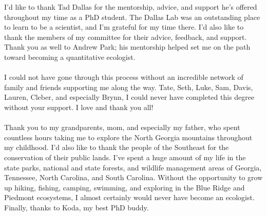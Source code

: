 
I’d like to thank Tad Dallas for the mentorship, advice, and support he’s offered throughout my time as a PhD student. The Dallas Lab was an outstanding place to learn to be a scientist, and I’m grateful for my time there. I’d also like to thank the members of my committee for their advice, feedback, and support. Thank you as well to Andrew Park; his mentorship helped set me on the path toward becoming a quantitative ecologist.
\paragraph{}
I could not have gone through this process without an incredible network of family and friends supporting me along the way. Tate, Seth, Luke, Sam, Davis, Lauren, Cleber, and especially Brynn, I could never have completed this degree without your support. I love and thank you all! 
\paragraph{}
Thank you to my grandparents, mom, and especially my father, who spent countless hours taking me to explore the North Georgia mountains throughout my childhood. I’d also like to thank the people of the Southeast for the conservation of their public lands. I’ve spent a huge amount of my life in the state parks, national and state forests, and wildlife management areas of Georgia, Tennessee, North Carolina, and South Carolina. Without the opportunity to grow up hiking, fishing, camping, swimming, and exploring in the Blue Ridge and Piedmont ecosystems, I almost certainly would never have become an ecologist. Finally, thanks to Koda, my best PhD buddy.